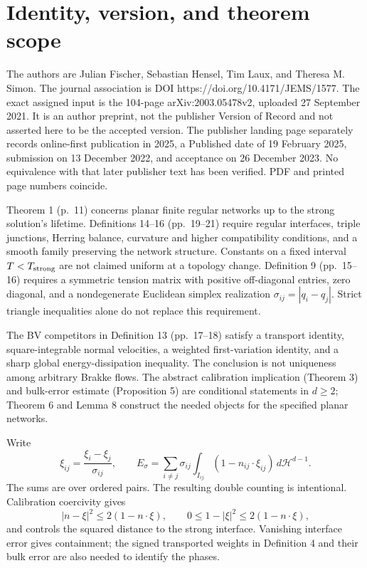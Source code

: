 \documentclass[10pt]{article}
\begin{document}
\section*{Identity, version, and theorem scope}
The authors are Julian Fischer, Sebastian Hensel, Tim Laux, and Theresa M. Simon. The journal association is DOI https://doi.org/10.4171/JEMS/1577. The exact assigned input is the 104-page arXiv:2003.05478v2, uploaded 27 September 2021. It is an author preprint, not the publisher Version of Record and not asserted here to be the accepted version. The publisher landing page separately records online-first publication in 2025, a Published date of 19 February 2025, submission on 13 December 2022, and acceptance on 26 December 2023. No equivalence with that later publisher text has been verified. PDF and printed page numbers coincide.\par
Theorem 1 (p. 11) concerns planar finite regular networks up to the strong solution’s lifetime. Definitions 14–16 (pp. 19–21) require regular interfaces, triple junctions, Herring balance, curvature and higher compatibility conditions, and a smooth family preserving the network structure. Constants on a fixed interval \(T<T_{\rm strong}\) are not claimed uniform at a topology change. Definition 9 (pp. 15–16) requires a symmetric tension matrix with positive off-diagonal entries, zero diagonal, and a nondegenerate Euclidean simplex realization \(\sigma_{ij}=|q_i-q_j|\). Strict triangle inequalities alone do not replace this requirement.\par
The BV competitors in Definition 13 (pp. 17–18) satisfy a transport identity, square-integrable normal velocities, a weighted first-variation identity, and a sharp global energy-dissipation inequality. The conclusion is not uniqueness among arbitrary Brakke flows. The abstract calibration implication (Theorem 3) and bulk-error estimate (Proposition 5) are conditional statements in \(d\ge2\); Theorem 6 and Lemma 8 construct the needed objects for the specified planar networks.\par
Write \[\xi_{ij}=\frac{\xi_i-\xi_j}{\sigma_{ij}},\qquad
 E_\sigma=\sum_{i\ne j}\sigma_{ij}\int_{I_{ij}}(1-n_{ij}\cdot\xi_{ij})\,d\mathcal H^{d-1}.\] The sums are over ordered pairs. The resulting double counting is intentional. Calibration coercivity gives \[|n-\xi|^2\le2(1-n\cdot\xi),\qquad
 0\le1-|\xi|^2\le2(1-n\cdot\xi),\] and controls the squared distance to the strong interface. Vanishing interface error gives containment; the signed transported weights in Definition 4 and their bulk error are also needed to identify the phases.\par
\end{document}
